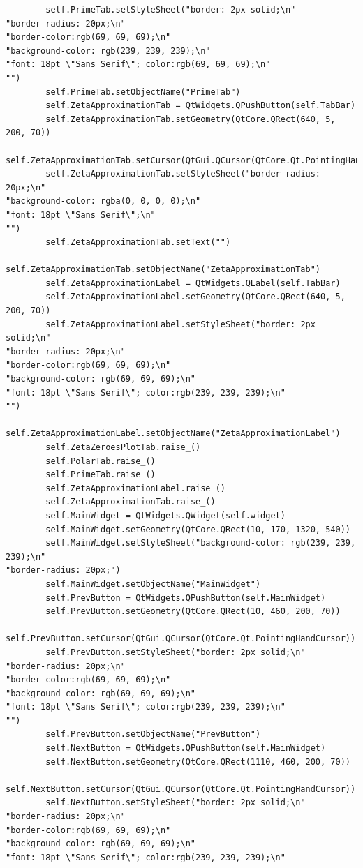 \documentclass{article}
\begin{document}
\begin{lstlisting}
        self.PrimeTab.setStyleSheet("border: 2px solid;\n"
"border-radius: 20px;\n"
"border-color:rgb(69, 69, 69);\n"
"background-color: rgb(239, 239, 239);\n"
"font: 18pt \"Sans Serif\"; color:rgb(69, 69, 69);\n"
"")
        self.PrimeTab.setObjectName("PrimeTab")
        self.ZetaApproximationTab = QtWidgets.QPushButton(self.TabBar)
        self.ZetaApproximationTab.setGeometry(QtCore.QRect(640, 5, 200, 70))
        self.ZetaApproximationTab.setCursor(QtGui.QCursor(QtCore.Qt.PointingHandCursor))
        self.ZetaApproximationTab.setStyleSheet("border-radius: 20px;\n"
"background-color: rgba(0, 0, 0, 0);\n"
"font: 18pt \"Sans Serif\";\n"
"")
        self.ZetaApproximationTab.setText("")
        self.ZetaApproximationTab.setObjectName("ZetaApproximationTab")
        self.ZetaApproximationLabel = QtWidgets.QLabel(self.TabBar)
        self.ZetaApproximationLabel.setGeometry(QtCore.QRect(640, 5, 200, 70))
        self.ZetaApproximationLabel.setStyleSheet("border: 2px solid;\n"
"border-radius: 20px;\n"
"border-color:rgb(69, 69, 69);\n"
"background-color: rgb(69, 69, 69);\n"
"font: 18pt \"Sans Serif\"; color:rgb(239, 239, 239);\n"
"")
        self.ZetaApproximationLabel.setObjectName("ZetaApproximationLabel")
        self.ZetaZeroesPlotTab.raise_()
        self.PolarTab.raise_()
        self.PrimeTab.raise_()
        self.ZetaApproximationLabel.raise_()
        self.ZetaApproximationTab.raise_()
        self.MainWidget = QtWidgets.QWidget(self.widget)
        self.MainWidget.setGeometry(QtCore.QRect(10, 170, 1320, 540))
        self.MainWidget.setStyleSheet("background-color: rgb(239, 239, 239);\n"
"border-radius: 20px;")
        self.MainWidget.setObjectName("MainWidget")
        self.PrevButton = QtWidgets.QPushButton(self.MainWidget)
        self.PrevButton.setGeometry(QtCore.QRect(10, 460, 200, 70))
        self.PrevButton.setCursor(QtGui.QCursor(QtCore.Qt.PointingHandCursor))
        self.PrevButton.setStyleSheet("border: 2px solid;\n"
"border-radius: 20px;\n"
"border-color:rgb(69, 69, 69);\n"
"background-color: rgb(69, 69, 69);\n"
"font: 18pt \"Sans Serif\"; color:rgb(239, 239, 239);\n"
"")
        self.PrevButton.setObjectName("PrevButton")
        self.NextButton = QtWidgets.QPushButton(self.MainWidget)
        self.NextButton.setGeometry(QtCore.QRect(1110, 460, 200, 70))
        self.NextButton.setCursor(QtGui.QCursor(QtCore.Qt.PointingHandCursor))
        self.NextButton.setStyleSheet("border: 2px solid;\n"
"border-radius: 20px;\n"
"border-color:rgb(69, 69, 69);\n"
"background-color: rgb(69, 69, 69);\n"
"font: 18pt \"Sans Serif\"; color:rgb(239, 239, 239);\n"

\end{lstlisting}
\end{document}
